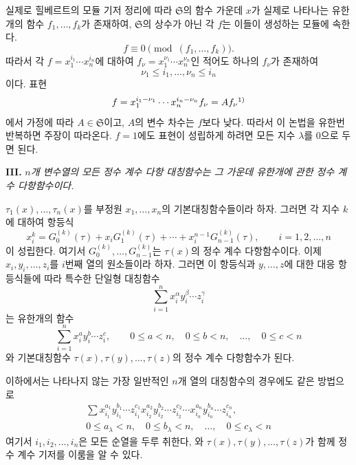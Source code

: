 실제로 힐베르트의 모듈 기저 정리에 따라 \(\mathfrak S\)의 함수 가운데 \(x\)가 실제로 나타나는 유한개의 함수 \(f_1,\ldots,f_k\)가 존재하여, \(\mathfrak S\)의 상수가 아닌 각 \(f\)는 이들이 생성하는 모듈에 속한다.
\[
f\equiv0\pmod{(f_1,\ldots,f_k)}.
\]
따라서 각 \(f=x_1^{i_1}\cdots x_n^{i_n}\)에 대하여 \(f_\nu=x_1^{\nu_1}\cdots x_n^{\nu_n}\)인 적어도 하나의 \(f_\nu\)가 존재하여
\[
\nu_1\le i_1,\ldots,\nu_n\le i_n
\]
이다. 표현
\[
f=x_1^{i_1-\nu_1}\cdots x_n^{i_n-\nu_n}f_\nu=Af_\nu\srcfnmark{1)}
\]
에서 가정에 따라 \(A\in\mathfrak S\)이고, \(A\)의 변수 차수는 \(f\)보다 낮다. 따라서 이 논법을 유한번 반복하면 주장이 따라온다. \(f=1\)에도 표현이 성립하게 하려면 모든 지수 \(\lambda\)를 0으로 두면 된다.

\textbf{III.} \emph{\(n\)개 변수열의 모든 정수 계수 다항 대칭함수는 그 가운데 유한개에 관한 정수 계수 다항함수이다.}

\(\tau_1(x),\ldots,\tau_n(x)\)를 부정원 \(x_1,\ldots,x_n\)의 기본대칭함수들이라 하자. 그러면 각 지수 \(k\)에 대하여 항등식
\[
x_i^k=G_0^{(k)}(\tau)+x_iG_1^{(k)}(\tau)+\cdots+x_i^{n-1}G_{n-1}^{(k)}(\tau),
\qquad i=1,2,\ldots,n
\]
이 성립한다. 여기서 \(G_0^{(k)},\ldots,G_{n-1}^{(k)}\)는 \(\tau(x)\)의 정수 계수 다항함수이다. 이제 \(x_i,y_i,\ldots,z_i\)를 \(i\)번째 열의 원소들이라 하자. 그러면 이 항등식과 \(y,\ldots,z\)에 대한 대응 항등식들에 따라 특수한 단일형 대칭함수
\[
\sum_{i=1}^n x_i^\alpha y_i^\beta\cdots z_i^\gamma
\]
는 유한개의 함수
\[
\sum_{i=1}^n x_i^a y_i^b\cdots z_i^c,
\qquad
0\le a<n,\quad0\le b<n,\quad\ldots,\quad0\le c<n
\]
와 기본대칭함수 \(\tau(x),\tau(y),\ldots,\tau(z)\)의 정수 계수 다항함수가 된다.

이하에서는 나타나지 않는 가장 일반적인 \(n\)개 열의 대칭함수의 경우에도 같은 방법으로
\[
\begin{gathered}
\sum x_{i_1}^{a_1}y_{i_1}^{b_1}\cdots z_{i_1}^{c_1}
      x_{i_2}^{a_2}y_{i_2}^{b_2}\cdots z_{i_2}^{c_2}
      \cdots
      x_{i_n}^{a_n}y_{i_n}^{b_n}\cdots z_{i_n}^{c_n},\\
0\le a_\lambda<n,\quad0\le b_\lambda<n,\quad\ldots,\quad0\le c_\lambda<n
\end{gathered}
\]
여기서 \(i_1,i_2,\ldots,i_n\)은 모든 순열을 두루 취한다, 와 \(\tau(x),\tau(y),\ldots,\tau(z)\)가 함께 정수 계수 기저를 이룸을 알 수 있다.

